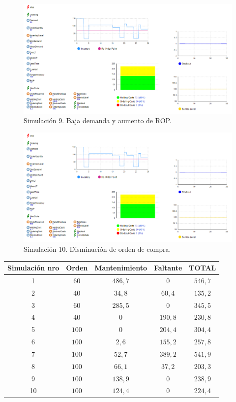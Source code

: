     \begin{figure}[H]
        \includegraphics[width=\linewidth]{images/img9invent}
        \caption{Simulación 9. Baja demanda y aumento de ROP.}
    \end{figure}

    \begin{figure}[H]
        \includegraphics[width=\linewidth]{images/img9invent}
        \caption{Simulación 10. Disminución de orden de compra.}
    \end{figure}

    \begin{tabular}{||c||c|c|c|c||}
        \hline \hline
        Simulación nro & Orden & Mantenimiento & Faltante & TOTAL\\
        \hline \hline
        1 & $60$ & $486,7$ & $0$ & $546,7$\\
        \hline
        2 & $40$ & $34,8$ & $60,4$ & $135,2$\\
        \hline
        3 & $60$ & $285,5$ & $0$ & $345,5$\\
        \hline
        4 & $40$ & $0$ & $190,8$ & $230,8$\\
        \hline
        5 & $100$ & $0$ & $204,4$ & $304,4$\\
        \hline
        6 & $100$ & $2,6$ & $155,2$ & $257,8$\\
        \hline
        7 & $100$ & $52,7$ & $389,2$ & $541,9$\\
        \hline
        8 & $100$ & $66,1$ & $37,2$ & $203,3$\\
        \hline
        9 & $100$ & $138,9$ & $0$ & $238,9$\\
        \hline
        10 & $100$ & $124,4$ & $0$ &$224,4$\\
        \hline \hline
    \end{tabular}

